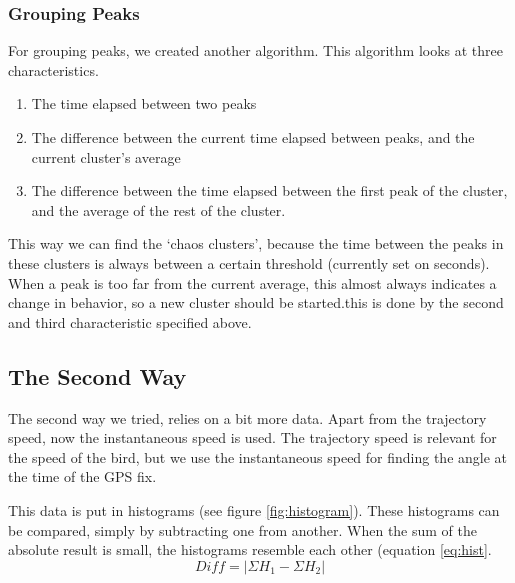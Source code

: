  \subsubsection{Grouping Peaks}
 For grouping peaks, we created another algorithm. This algorithm looks at three
 characteristics.  
 \begin{enumerate}
 \item The time elapsed between two peaks
 \item The difference between the current time elapsed between peaks, and the
 current cluster's average
 \item The difference between the time elapsed between the first peak of the
 cluster, and the average of the rest of the cluster.
 \end{enumerate}
 This way we can find the `chaos clusters', because the time between the peaks
 in these clusters is always between a certain threshold (currently set on
 \timeThreshold seconds). 
 When a peak is too far from the  current average, this almost always indicates
 a change in behavior, so a new cluster should be started.this is done by the
 second and third characteristic specified above.

\subsection{The Second Way}
The second way we tried, relies on a bit more data. Apart from the trajectory
speed, now the instantaneous speed is used. The trajectory speed is relevant for
the speed of the bird, but we use the instantaneous speed for finding the angle
at the time of the GPS fix. 

This data is put in histograms (see figure \ref{fig:histogram}). These
histograms can be compared, simply by subtracting one from another. When the sum of
the absolute result is small, the histograms resemble each other (equation
\ref{eq:hist}. 
\begin{equation}
 \label{eq:hist}
 Diff = \left| \Sigma H_1 - \Sigma H_2 \right|
\end{equation}

